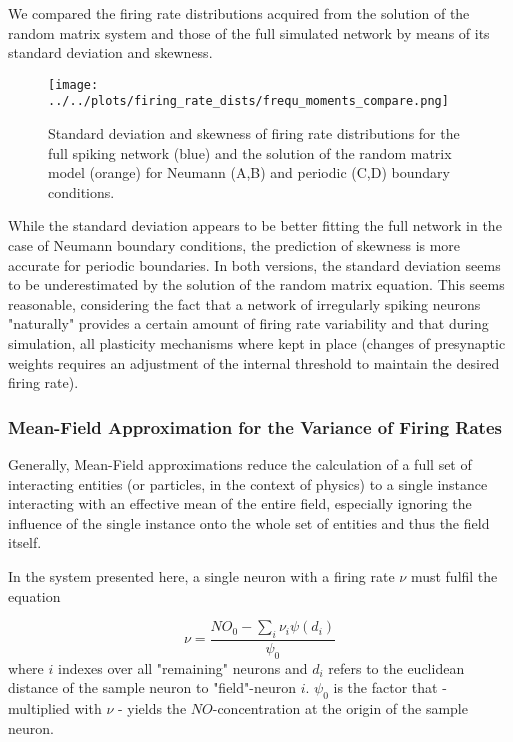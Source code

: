 \documentclass[10pt,a4paper]{article}
\begin{document}
We compared the firing rate distributions acquired from the solution of the random matrix system and those of the full simulated network by means of its standard deviation and skewness.
\begin{figure}
\texttt{[image: ../../plots/firing\_rate\_dists/frequ\_moments\_compare.png]}
\caption{Standard deviation and skewness of firing rate distributions for the full spiking network (blue) and the solution of the random matrix model (orange) for Neumann (A,B) and periodic (C,D) boundary conditions.}
\label{frequ_moments_compare}
\end{figure}
While the standard deviation appears to be better fitting the full network in the case of Neumann boundary conditions, the prediction of skewness is more accurate for periodic boundaries. In both versions, the standard deviation seems to be underestimated by the solution of the random matrix equation. This seems reasonable, considering the fact that a network of irregularly spiking neurons "naturally" provides a certain amount of firing rate variability and that during simulation, all plasticity mechanisms where kept in place (changes of presynaptic weights requires an adjustment of the internal threshold to maintain the desired firing rate). 

\subsubsection{Mean-Field Approximation for the Variance of Firing Rates}

Generally, Mean-Field approximations reduce the calculation of a full set of interacting entities (or particles, in the context of physics) to a single instance interacting with an effective mean of the entire field, especially ignoring the influence of the single instance onto the whole set of entities and thus the field itself.

In the system presented here, a single neuron with a firing rate $\nu$ must fulfil the equation

\begin{equation}
\nu =\frac{NO_0 - \sum \limits_{i} \nu_i \psi(d_i)}{\psi_0}
\label{sample_neuron_firing_rate}
\end{equation}
where $i$ indexes over all "remaining" neurons and $d_i$ refers to the euclidean distance of the sample neuron to "field"-neuron $i$. $\psi_0$ is the factor that - multiplied with $\nu$ - yields the $NO$-concentration at the origin of the sample neuron.
\end{document}

